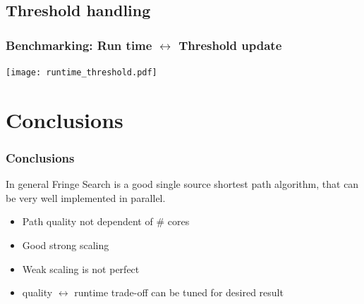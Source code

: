 \documentclass{beamer}
\begin{document}
\subsection{Threshold handling}
\begin{frame}
\frametitle{Benchmarking: Run time $\leftrightarrow$ Threshold update}
\begin{center}
	\texttt{[image: runtime\_threshold.pdf]}
\end{center}
\end{frame}

\section{Conclusions}
\begin{frame}
\frametitle{Conclusions}
In general Fringe Search is a good single source shortest path algorithm, that can be very well implemented in parallel.\\
\begin{itemize}
\item Path quality not dependent of \# cores
\item Good strong scaling
\item Weak scaling is not perfect
\item quality $\leftrightarrow$ runtime trade-off can be tuned for desired result
\end{itemize}
\end{frame}



%
\end{document}
